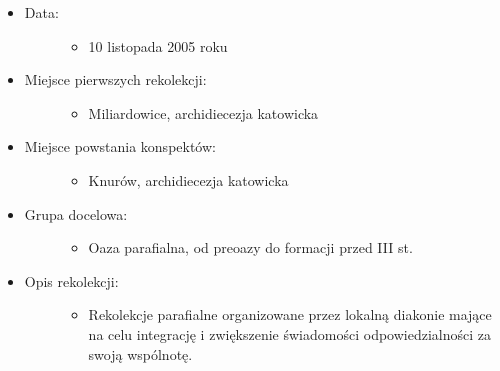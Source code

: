\documentclass[a5paper,10pt,polish]{book}
\begin{document}
\begin{itemize}
\item {} \begin{description}
\item[{Data:}] \leavevmode\begin{itemize}
\item {} 
10 listopada 2005 roku

\end{itemize}

\end{description}

\item {} \begin{description}
\item[{Miejsce pierwszych rekolekcji:}] \leavevmode\begin{itemize}
\item {} 
Miliardowice, archidiecezja katowicka

\end{itemize}

\end{description}

\item {} \begin{description}
\item[{Miejsce powstania konspektów:}] \leavevmode\begin{itemize}
\item {} 
Knurów, archidiecezja katowicka

\end{itemize}

\end{description}

\item {} \begin{description}
\item[{Grupa docelowa:}] \leavevmode\begin{itemize}
\item {} 
Oaza parafialna, od preoazy do formacji przed III st.

\end{itemize}

\end{description}

\item {} \begin{description}
\item[{Opis rekolekcji:}] \leavevmode\begin{itemize}
\item {} 
Rekolekcje parafialne organizowane przez lokalną diakonie mające na celu integrację i zwiększenie świadomości odpowiedzialności za swoją wspólnotę.

\end{itemize}

\end{description}

\end{itemize}
\end{document}
